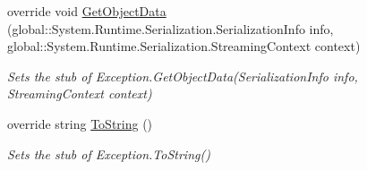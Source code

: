 \begin{DoxyCompactItemize}
override void \hyperlink{class_system_1_1_threading_1_1_fakes_1_1_stub_abandoned_mutex_exception_a8eb04bfd3389e376bcfd57d30f95c48d}{Get\-Object\-Data} (global\-::\-System.\-Runtime.\-Serialization.\-Serialization\-Info info, global\-::\-System.\-Runtime.\-Serialization.\-Streaming\-Context context)
\begin{DoxyCompactList}\small\item\em Sets the stub of Exception.\-Get\-Object\-Data(\-Serialization\-Info info, Streaming\-Context context)\end{DoxyCompactList}\item 
override string \hyperlink{class_system_1_1_threading_1_1_fakes_1_1_stub_abandoned_mutex_exception_a0b00c7d70c36a0d7e1c9944ddc104626}{To\-String} ()
\begin{DoxyCompactList}\small\item\em Sets the stub of Exception.\-To\-String()\end{DoxyCompactList}\end{DoxyCompactItemize}
